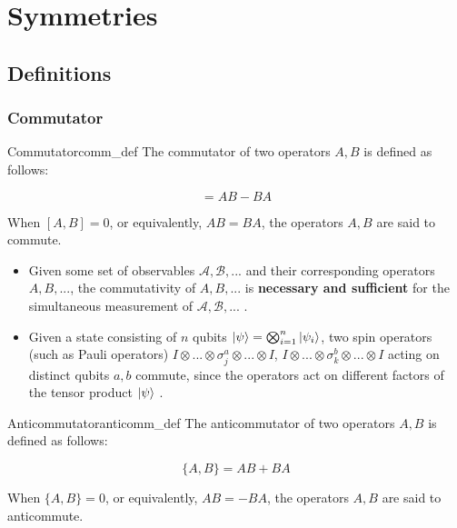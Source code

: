 \documentclass{article}
\begin{document}
\section{Symmetries}
	
\subsection{Definitions}\label{ssec:def}
	
\subsubsection{Commutator}
\begin{definition}{Commutator}{comm_def}
	The commutator of two operators $A, B$ is defined as follows:
			
	\begin{equation}
		[A, B] = AB - BA
	\end{equation}
			
	When $[A, B] = 0$, or equivalently, $AB = BA$, the operators $A, B$ are said to commute. \cite{cantwell2016introduction}
	\cite{vonNeumann:2018:MFQ}
\end{definition}
\begin{itemize}
	\item Given some set of observables $\mathcal{A}, \mathcal{B},...$ and their corresponding operators $A, B, ...$, the commutativity of $A, B, ...$ is \textbf{necessary and sufficient} for the simultaneous measurement of $\mathcal{A}, \mathcal{B},...$ \cite{vonNeumann:2018:MFQ}.
	      		
	\item Given a state consisting of $n$ qubits $\ket{\psi} = \bigotimes_{i = 1}^n\ket{\psi_i}$, two spin operators (such as Pauli operators) $I \otimes ...\otimes \sigma^a_j \otimes ... \otimes I$, $I \otimes ...\otimes \sigma^b_k \otimes ... \otimes I$ acting on distinct qubits $a, b$ commute, since the operators act on different factors of the tensor product $\ket{\psi}$ \cite{corry2017symmetry}.
\end{itemize}
\begin{definition}{Anticommutator}{anticomm_def}
	The anticommutator of two operators $A, B$ is defined as follows:
			
	\begin{equation}
		\{A, B\} = AB + BA
	\end{equation}
			
	When $\{A, B\} = 0$, or equivalently, $AB = -BA$, the operators $A, B$ are said to anticommute.
\end{definition}
\end{document}
